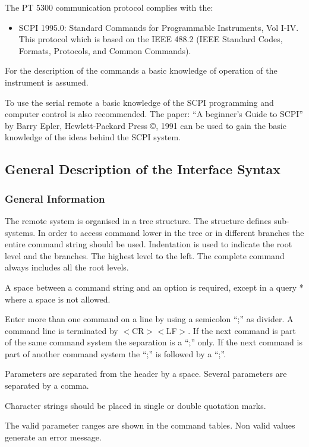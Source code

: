 The PT 5300 communication protocol complies with the:
\begin{itemize}
\item SCPI 1995.0: Standard Commands for Programmable Instruments, Vol I-IV. This protocol which is based on the IEEE 488.2 (IEEE Standard Codes, Formats, Protocols, and Common Commands). 
\end{itemize}

For the description of the commands a basic knowledge of operation of the instrument is assumed.

To use the serial remote a basic knowledge of the SCPI programming and computer control is also recommended. The paper: ``A beginner's Guide to SCPI'' by Barry Epler, Hewlett-Packard Press \copyright, 1991 can be used to gain the basic knowledge of the ideas behind the SCPI system.

\subsection{General Description of the Interface Syntax}

\subsubsection{General Information}
The remote system is organised in a tree structure. The structure defines sub-systems. In order to access command lower in the tree or in different branches the entire command string should be used. Indentation is used to indicate the root level and the branches. The highest level to the left. The complete command always includes all the root levels.

A space between a command string and an option is required, except in a query * where a space is not allowed.

Enter more than one command on a line by using a semicolon ``;'' as divider. A command line is terminated by $<$CR$> <$LF$>$. If the next command is part of the same command system the separation is a ``;'' only. If the next command is part of another command system the ``;'' is followed by a ``;''.

Parameters are separated from the header by a space. Several parameters are separated by a comma. 

Character strings should be placed in single or double quotation marks. 

The valid parameter ranges are shown in the command tables. Non valid values generate an error message.

